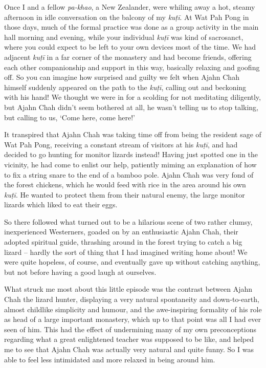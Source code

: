 Once I and a fellow \emph{pa-khao}, a New Zealander, were whiling away a
hot, steamy afternoon in idle conversation on the balcony of my
\emph{kuṭī}. At Wat Pah Pong in those days, much of the formal practice
was done as a group activity in the main hall morning and evening, while
your individual \emph{kuṭī} was kind of sacrosanct, where you could
expect to be left to your own devices most of the time. We had adjacent
\emph{kuṭī} in a far corner of the monastery and had become friends, 
offering each other companionship and support in this way, basically
relaxing and goofing off. So you can imagine how surprised and guilty we
felt when Ajahn Chah himself suddenly appeared on the path to the
\emph{kuṭī}, calling out and beckoning with his hand! We thought we were
in for a scolding for not meditating diligently, but Ajahn Chah didn't
seem bothered at all, he wasn't telling us to stop talking, but calling
to us, `Come here, come here!'

It transpired that Ajahn Chah was taking time off from being the
resident sage of Wat Pah Pong, receiving a constant stream of visitors
at his \emph{kuṭī}, and had decided to go hunting for monitor lizards
instead! Having just spotted one in the vicinity, he had come to enlist
our help, patiently miming an explanation of how to fix a string snare
to the end of a bamboo pole. Ajahn Chah was very fond of the forest
chickens, which he would feed with rice in the area around his own
\emph{kuṭī}. He wanted to protect them from their natural enemy, the
large monitor lizards which liked to eat their eggs. 

So there followed what turned out to be a hilarious scene of two rather
clumsy, inexperienced Westerners, goaded on by an enthusiastic Ajahn
Chah, their adopted spiritual guide, thrashing around in the forest
trying to catch a big lizard -- hardly the sort of thing that I had
imagined writing home about! We were quite hopeless, of course, and
eventually gave up without catching anything, but not before having a
good laugh at ourselves. 

What struck me most about this little episode was the contrast between
Ajahn Chah the lizard hunter, displaying a very natural spontaneity and
down-to-earth, almost childlike simplicity and humour, and the
awe-inspiring formality of his role as head of a large important
monastery, which up to that point was all I had ever seen of him. This
had the effect of undermining many of my own preconceptions regarding
what a great enlightened teacher was supposed to be like, and helped me
to see that Ajahn Chah was actually very natural and quite funny. So I
was able to feel less intimidated and more relaxed in being around him. 

